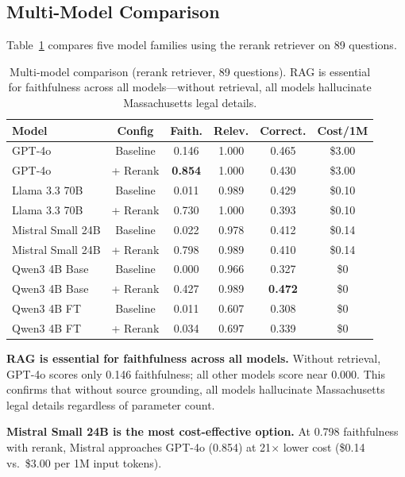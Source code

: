 \documentclass{article}
\begin{document}
\subsection{Multi-Model Comparison}
\label{sec:model_comparison}

Table~\ref{tab:models} compares five model families using the rerank retriever on 89 questions.

\begin{table}[t]
  \caption{Multi-model comparison (rerank retriever, 89 questions). RAG is essential for faithfulness across all models---without retrieval, all models hallucinate Massachusetts legal details.}
  \label{tab:models}
  \centering
  \small
  \begin{tabular}{lccccc}
    \toprule
    Model & Config & Faith. & Relev. & Correct. & Cost/1M \\
    \midrule
    GPT-4o & Baseline & 0.146 & 1.000 & 0.465 & \$3.00 \\
    GPT-4o & + Rerank & \textbf{0.854} & 1.000 & 0.430 & \$3.00 \\
    \midrule
    Llama 3.3 70B & Baseline & 0.011 & 0.989 & 0.429 & \$0.10 \\
    Llama 3.3 70B & + Rerank & 0.730 & 1.000 & 0.393 & \$0.10 \\
    \midrule
    Mistral Small 24B & Baseline & 0.022 & 0.978 & 0.412 & \$0.14 \\
    Mistral Small 24B & + Rerank & 0.798 & 0.989 & 0.410 & \$0.14 \\
    \midrule
    Qwen3 4B Base & Baseline & 0.000 & 0.966 & 0.327 & \$0 \\
    Qwen3 4B Base & + Rerank & 0.427 & 0.989 & \textbf{0.472} & \$0 \\
    \midrule
    Qwen3 4B FT & Baseline & 0.011 & 0.607 & 0.308 & \$0 \\
    Qwen3 4B FT & + Rerank & 0.034 & 0.697 & 0.339 & \$0 \\
    \bottomrule
  \end{tabular}
\end{table}

\textbf{RAG is essential for faithfulness across all models.} Without retrieval, GPT-4o scores only 0.146 faithfulness; all other models score near 0.000. This confirms that without source grounding, all models hallucinate Massachusetts legal details regardless of parameter count.

\textbf{Mistral Small 24B is the most cost-effective option.} At 0.798 faithfulness with rerank, Mistral approaches GPT-4o (0.854) at 21$\times$ lower cost (\$0.14 vs.\ \$3.00 per 1M input tokens).
\end{document}
